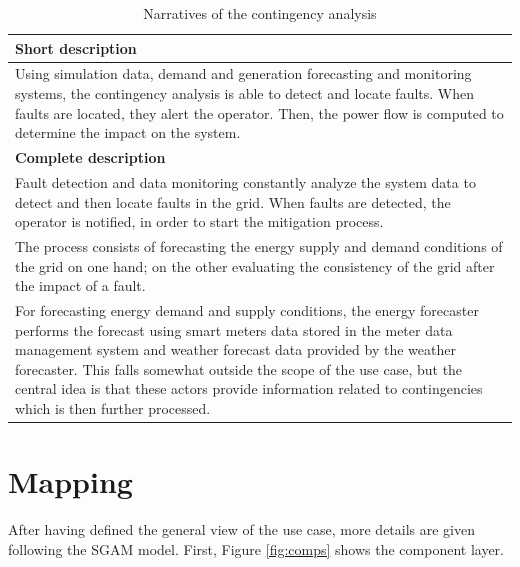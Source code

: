 \begin{table}[!htb]\centering
  \renewcommand{\arraystretch}{2}
  \begin{tabularx}{\linewidth}{|L|}
    \hline
    \textbf{Short description} \\
    \hline
    Using simulation data, demand and generation forecasting and monitoring systems, the contingency analysis is able to detect and locate faults. When faults are located, they alert the operator. Then, the power flow is computed to determine the impact on the system. \\
    \hline
    \textbf{Complete description} \\
    \hline
    Fault detection and data monitoring constantly analyze the system data to detect and then locate faults in the grid. When faults are detected, the operator is notified, in order to start the mitigation process. \\
The process consists of forecasting the energy supply and demand conditions of the grid on one hand; on the other evaluating the consistency of the grid after the impact of a fault. \\
For forecasting energy demand and supply conditions, the energy forecaster performs the forecast using smart meters data stored in the meter data management system and weather forecast data provided by the weather forecaster. This falls somewhat outside the scope of the use case, but the central idea is that these actors provide information related to contingencies which is then further processed. \\
\hline
  \end{tabularx}
  \caption{Narratives of the contingency analysis}
  \label{tab:descr}
\end{table}

\section{Mapping}
After having defined the general view of the use case, more details are given following the SGAM model. First, Figure \ref{fig:comps} shows the component layer.

